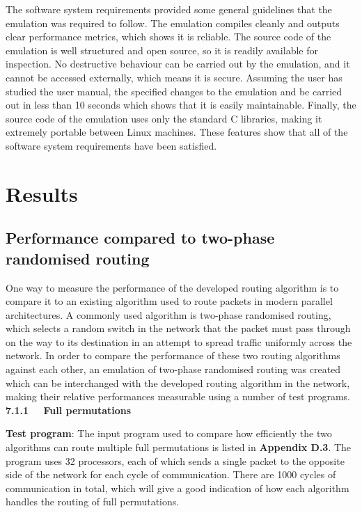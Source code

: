 \documentclass[a4paper, 12pt]{article}
\begin{document}
The software system requirements provided some general guidelines that the emulation was required to follow. The emulation compiles cleanly and outputs clear performance metrics, which shows it is reliable. The source code of the emulation is well structured and open source, so it is readily available for inspection. No destructive behaviour can be carried out by the emulation, and it cannot be accessed externally, which means it is secure. Assuming the user has studied the user manual, the specified changes to the emulation and be carried out in less than 10 seconds which shows that it is easily maintainable. Finally, the source code of the emulation uses only the standard C libraries, making it extremely portable between Linux machines. These features show that all of the software system requirements have been satisfied.

\newpage
\section{Results}

\subsection{Performance compared to two-phase randomised routing}

One way to measure the performance of the developed routing algorithm is to compare it to an existing algorithm used to route packets in modern parallel architectures. A commonly used algorithm is two-phase randomised routing, which selects a random switch in the network that the packet must pass through on the way to its destination in an attempt to spread traffic uniformly across the network. In order to compare the performance of these two routing algorithms against each other, an emulation of two-phase randomised routing was created which can be interchanged with the developed routing algorithm in the network, making their relative performances measurable using a number of test programs.\\

\noindent\textbf{7.1.1 \ \ Full permutations}

\noindent\textbf{Test program}: The input program used to compare how efficiently the two algorithms can route multiple full permutations is listed in \textbf{Appendix D.3}. The program uses 32 processors, each of which sends a single packet to the opposite side of the network for each cycle of communication. There are 1000 cycles of communication in total, which will give a good indication of how each algorithm handles the routing of full permutations.  
\end{document}
